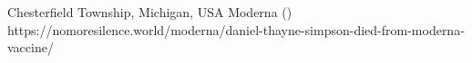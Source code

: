           {Chesterfield Township, Michigan, USA}
          {}
          {Moderna}
          {}
          {
             ()
          }
          {https://nomoresilence.world/moderna/daniel-thayne-simpson-died-from-moderna-vaccine/}

